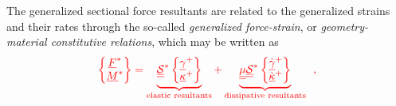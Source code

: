 \documentclass[12pt,a4paper,oneside,english]{abntex2} %
\newcommand{\fix}[1]{{\color{red}#1}}
\newcommand{\vect}[1]{\underline{#1}}
\def\tens#1{\underline{\underline{#1}}}
\def\gam{\vect{\gamma}}
\def\gamp{\gam^{+}}
\def\gampdot{\dot{\gam}^{+}}
\def\kap{\vect{\kappa}}
\def\kapp{\kap^{+}}
\def\kappdot{\dot{\kap}^{+}}
\def\F{\vect{F}}
\def\Fs{\F^*}
\def\M{\vect{M}}
\def\Ms{\M^*}
\def\Stiff{\mathcal{\tens{S}}^*}
\begin{document}
The generalized sectional force resultants are related to the generalized strains \fix{and their rates} through the so-called \textit{generalized force-strain}, or \textit{geometry-material constitutive relations}, which may be written as
\begin{align}
    \fix{\begin{Bmatrix}
    \Fs \\ \Ms
    \end{Bmatrix}
    = \underbrace{\Stiff
    \begin{Bmatrix}
    \gamp \\ \kapp
    \end{Bmatrix}}_{\text{elastic resultants}}
    + \underbrace{\tens{\mu}\Stiff
    \begin{Bmatrix}
    \gampdot \\ \kappdot
    \end{Bmatrix}}_{\text{dissipative resultants}} \ \ ,}
    \label{eq:constitutive}
\end{align}
\end{document}
